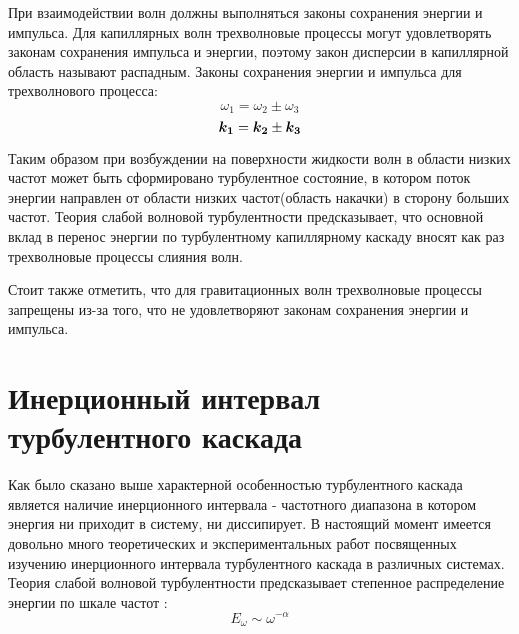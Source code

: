 При взаимодействии волн должны выполняться законы сохранения энергии и импульса. Для капиллярных волн трехволновые процессы могут удовлетворять законам сохранения импульса и энергии, поэтому закон дисперсии в капиллярной область называют распадным. Законы сохранения энергии и импульса для трехволнового процесса:
\begin{equation}
 \label{eq:saveOmega}
\omega_1 = \omega_2 \pm \omega_3
\end{equation}
\begin{equation}
 \label{eq:saveK}
\mbox{\boldmath$k_1$} = \mbox{\boldmath$k_2$} \pm \mbox{\boldmath$k_3$}
\end{equation}

Таким образом при возбуждении на поверхности жидкости волн в области низких частот может быть сформировано турбулентное состояние, в котором поток энергии направлен от области низких частот(область накачки) в сторону больших частот. Теория слабой волновой турбулентности \cite{Zakharov} предсказывает, что основной вклад в перенос энергии по турбулентному капиллярному каскаду вносят как раз трехволновые процессы слияния волн. 

Стоит также отметить, что для гравитационных волн трехволновые процессы запрещены из-за того, что не удовлетворяют законам сохранения энергии и импульса.


\section{Инерционный интервал турбулентного каскада}%

Как было сказано выше характерной особенностью турбулентного каскада является наличие инерционного интервала -  частотного диапазона в котором энергия ни приходит в систему, ни диссипирует.
В настоящий момент имеется довольно много теоретических и экспериментальных работ посвященных изучению инерционного интервала турбулентного каскада в различных системах. Теория слабой волновой турбулентности предсказывает степенное распределение энергии по шкале частот \cite{Zakharov}:
\begin{equation}
\label{eq:EOmega}
E_\omega \sim \omega^{-\alpha}
\end{equation}

